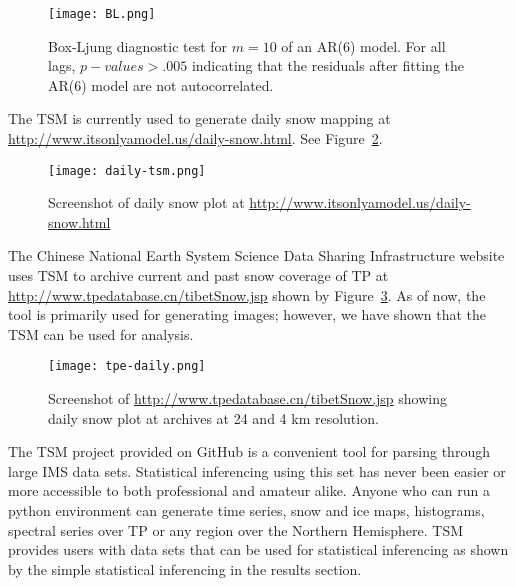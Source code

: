 \begin{figure}[ht]
\centering
\begin{minipage}{3in}
\texttt{[image: BL.png]}
\caption{Box-Ljung diagnostic test for $m=10$ of an AR(6) model. For all lags, $p-values>.005$ indicating that the residuals after fitting the AR(6) model are not autocorrelated.}
\label{fig:BL}
\end{minipage}
\end{figure}


The TSM is currently used to generate daily snow mapping at \url{http://www.itsonlyamodel.us/daily-snow.html}. See Figure~\ref{fig:daily_map}.

\begin{figure}[ht]
\centering
\begin{minipage}{4in}
\texttt{[image: daily-tsm.png]}
\caption{Screenshot of daily snow plot at \url{http://www.itsonlyamodel.us/daily-snow.html}}
\label{fig:daily_map}
\end{minipage}
\end{figure}

The Chinese National Earth System Science Data Sharing Infrastructure website uses TSM to archive current and past snow coverage of TP at \url{http://www.tpedatabase.cn/tibetSnow.jsp}\cite{TP_database} shown by Figure~\ref{fig:ch_daily_map}. As of now, the tool is primarily used for generating images; however, we have shown that the TSM can be used for analysis.

\begin{figure}[ht]
\centering
\begin{minipage}{4in}
\texttt{[image: tpe-daily.png]}
\caption{Screenshot of \url{http://www.tpedatabase.cn/tibetSnow.jsp} showing daily snow plot at archives at 24 and 4 km resolution.}
\label{fig:ch_daily_map}
\end{minipage}
\end{figure}


The TSM project provided on GitHub \cite{git_proj} is a convenient tool for parsing through large IMS data sets. Statistical inferencing using this set has never been easier or more accessible to both professional and amateur alike. Anyone who can run a python environment can generate time series, snow and ice maps, histograms, spectral series over TP or any region over the Northern Hemisphere. TSM provides users with data sets that can be used for statistical inferencing as shown by the simple statistical inferencing in the results section.

